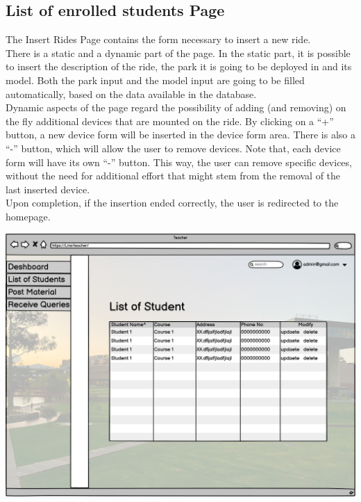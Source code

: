 \subsection{List of enrolled students Page}
The Insert Rides Page contains the form necessary to insert a new ride.\\

There is a static and a dynamic part of the page. In the static part, it is possible to insert the description of the ride, the park it is going to be deployed in and its model. Both the park input and the model input are going to be filled automatically, based on the data available in the database.\\

Dynamic aspects of the page regard the possibility of adding (and removing) on the fly additional devices that are mounted on the ride. By clicking on a “+” button, a new device form will be inserted in the device form area. There is also a “-” button, which will allow the user to remove devices. Note that, each device form will have its own “-” button. This way, the user can remove specific devices, without the need for additional effort that might stem from the removal of the last inserted device.\\

Upon completion, if the insertion ended correctly, the user is redirected to the homepage.

\includegraphics[width=\columnwidth]{images/List of Students teacher.png}